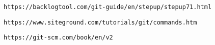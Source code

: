 
\begin{thebibliography}{99}

	\normalsize
	
	
	
	\bibitem{} {}
	\texttt{https://backlogtool.com/git-guide/en/stepup/stepup71.html}

     \bibitem{}	{}
	 \texttt{https://www.siteground.com/tutorials/git/commands.htm}
	 
	 
	 \bibitem{}{}
	 \texttt{https://git-scm.com/book/en/v2}
	 
	 
\end{thebibliography}
        
